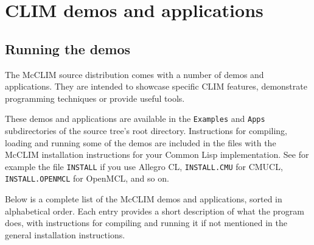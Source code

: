 \chapter{CLIM demos and applications}

\section{Running the demos}

The McCLIM source distribution comes with a number of demos and
applications.  They are intended to showcase specific CLIM features,
demonstrate programming techniques or provide useful tools.

These demos and applications are available in the \texttt{Examples} and
\texttt{Apps} subdirectories of the source tree's root directory.
Instructions for compiling, loading and running some of the demos are
included in the files with the McCLIM installation instructions for your
Common Lisp implementation. See for example the file \texttt{INSTALL} if you
use Allegro CL, \texttt{INSTALL.CMU} for CMUCL, \texttt{INSTALL.OPENMCL} for
OpenMCL, and so on.

Below is a complete list of the McCLIM demos and applications, sorted in
alphabetical order.  Each entry provides a short description of what the
program does, with instructions for compiling and running it if not
mentioned in the general installation instructions.

